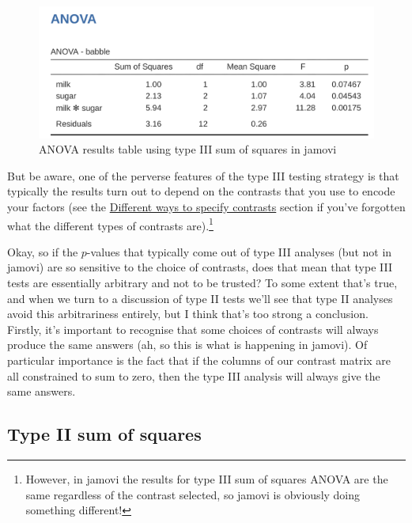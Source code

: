 \documentclass[
  a4paper,
]{book}
\begin{document}
\begin{figure}

\includegraphics[width=1\textwidth,height=\textheight]{images/fig14-29.png} \hfill{}

\caption{\label{fig-fig14-29}ANOVA results table using type III sum of
squares in jamovi}

\end{figure}

But be aware, one of the perverse features of the type III testing
strategy is that typically the results turn out to depend on the
contrasts that you use to encode your factors (see the
\protect\hyperlink{different-ways-to-specify-contrasts}{Different ways
to specify contrasts} section if you've forgotten what the different
types of contrasts are).\footnote{However, in jamovi the results for
  type III sum of squares ANOVA are the same regardless of the contrast
  selected, so jamovi is obviously doing something different!}

Okay, so if the \(p\)-values that typically come out of type III
analyses (but not in jamovi) are so sensitive to the choice of
contrasts, does that mean that type III tests are essentially arbitrary
and not to be trusted? To some extent that's true, and when we turn to a
discussion of type II tests we'll see that type II analyses avoid this
arbitrariness entirely, but I think that's too strong a conclusion.
Firstly, it's important to recognise that some choices of contrasts will
always produce the same answers (ah, so this is what is happening in
jamovi). Of particular importance is the fact that if the columns of our
contrast matrix are all constrained to sum to zero, then the type III
analysis will always give the same answers.

\hypertarget{type-ii-sum-of-squares}{%
\subsection{Type II sum of squares}\label{type-ii-sum-of-squares}}
\end{document}
